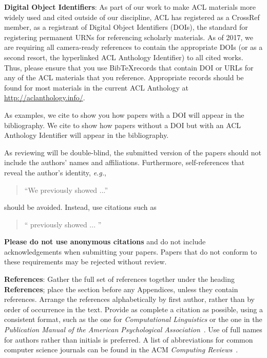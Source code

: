 \documentclass[11pt,a4paper]{article}
\begin{document}
\textbf{Digital Object Identifiers}:  As part of our work to make ACL
materials more widely used and cited outside of our discipline, ACL
has registered as a CrossRef member, as a registrant of Digital Object
Identifiers (DOIs), the standard for registering permanent URNs for
referencing scholarly materials.  As of 2017, we are requiring all
camera-ready references to contain the appropriate DOIs (or as a
second resort, the hyperlinked ACL Anthology Identifier) to all cited
works.  Thus, please ensure that you use Bib\TeX records that contain
DOI or URLs for any of the ACL materials that you reference.
Appropriate records should be found for most materials in the current
ACL Anthology at \url{http://aclanthology.info/}.

As examples, we cite \cite{P16-1001} to show you how papers with a DOI
will appear in the bibliography.  We cite \cite{C14-1001} to show how
papers without a DOI but with an ACL Anthology Identifier will appear
in the bibliography.  

As reviewing will be double-blind, the submitted version of the papers
should not include the authors' names and affiliations. Furthermore,
self-references that reveal the author's identity, {\em e.g.},
\begin{quote}
``We previously showed \cite{Gusfield:97} ...''  
\end{quote}
should be avoided. Instead, use citations such as 
\begin{quote}
``\citeauthor{Gusfield:97} 
previously showed ... ''
\end{quote}

\textbf{Please do not use anonymous citations} and do not include
acknowledgements when submitting your papers. Papers that do not
conform to these requirements may be rejected without review.

\textbf{References}: Gather the full set of references together under
the heading {\bf References}; place the section before any Appendices,
unless they contain references. Arrange the references alphabetically
by first author, rather than by order of occurrence in the text.
Provide as complete a citation as possible, using a consistent format,
such as the one for {\em Computational Linguistics\/} or the one in the 
{\em Publication Manual of the American 
Psychological Association\/}~\cite{APA:83}.  Use of full names for
authors rather than initials is preferred.  A list of abbreviations
for common computer science journals can be found in the ACM 
{\em Computing Reviews\/}~\cite{ACM:83}.
\end{document}
